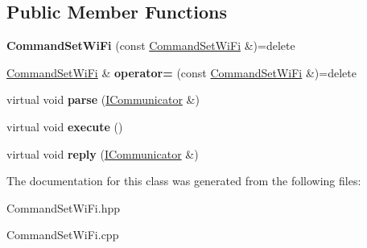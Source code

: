 \subsection*{Public Member Functions}
\begin{DoxyCompactItemize}
\item 
\mbox{\label{classwood_box_1_1communication_1_1commands_1_1_command_set_wi_fi_ac2a83301978b8c5caedbfe9550739c6d}} 
{\bfseries Command\+Set\+Wi\+Fi} (const \mbox{\hyperlink{classwood_box_1_1communication_1_1commands_1_1_command_set_wi_fi}{Command\+Set\+Wi\+Fi}} \&)=delete
\item 
\mbox{\label{classwood_box_1_1communication_1_1commands_1_1_command_set_wi_fi_ae75518186c9db39992718bbe09d8e594}} 
\mbox{\hyperlink{classwood_box_1_1communication_1_1commands_1_1_command_set_wi_fi}{Command\+Set\+Wi\+Fi}} \& {\bfseries operator=} (const \mbox{\hyperlink{classwood_box_1_1communication_1_1commands_1_1_command_set_wi_fi}{Command\+Set\+Wi\+Fi}} \&)=delete
\item 
\mbox{\label{classwood_box_1_1communication_1_1commands_1_1_command_set_wi_fi_a58bad1b867cf32211642a8ef36b640fe}} 
virtual void {\bfseries parse} (\mbox{\hyperlink{classwood_box_1_1communication_1_1_i_communicator}{I\+Communicator}} \&)
\item 
\mbox{\label{classwood_box_1_1communication_1_1commands_1_1_command_set_wi_fi_ad94b980986a752bf0cd5778487313d8f}} 
virtual void {\bfseries execute} ()
\item 
\mbox{\label{classwood_box_1_1communication_1_1commands_1_1_command_set_wi_fi_adfff528e70092f53a231b953e820b142}} 
virtual void {\bfseries reply} (\mbox{\hyperlink{classwood_box_1_1communication_1_1_i_communicator}{I\+Communicator}} \&)
\end{DoxyCompactItemize}


The documentation for this class was generated from the following files\+:\begin{DoxyCompactItemize}
\item 
Command\+Set\+Wi\+Fi.\+hpp\item 
Command\+Set\+Wi\+Fi.\+cpp\end{DoxyCompactItemize}
